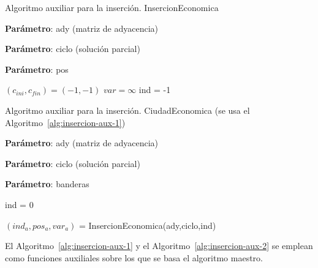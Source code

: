 \begin{algorithm}[H]
  \caption{Algoritmo auxiliar para la inserción. InsercionEconomica}\label{alg:insercion-aux-1}
  \begin{minipage}{0.92\textwidth}
    \textbf{Parámetro}: ady (matriz de adyacencia)

    \textbf{Parámetro}: ciclo (solución parcial)

    \textbf{Parámetro}: pos
  \end{minipage}

  $(c_{ini}, c_{fin}) = (-1,-1)$\;
  $var = \infty$\;
  ind = -1\;

  
\end{algorithm}

\begin{algorithm}[H]
  \caption{Algoritmo auxiliar para la inserción. CiudadEconomica (se usa el Algoritmo~\ref{alg:insercion-aux-1})}\label{alg:insercion-aux-2}
  \begin{minipage}{0.92\textwidth}
    \textbf{Parámetro}: ady (matriz de adyacencia)

    \textbf{Parámetro}: ciclo (solución parcial)

    \textbf{Parámetro}: banderas
  \end{minipage}

  ind = 0\;


  $(ind_a, pos_a, var_a)$ = InsercionEconomica(ady,ciclo,ind)\;


  
\end{algorithm}

El Algoritmo~\ref{alg:insercion-aux-1} y el Algoritmo~\ref{alg:insercion-aux-2}
se emplean como funciones auxiliales sobre los que se basa el algoritmo maestro. 

